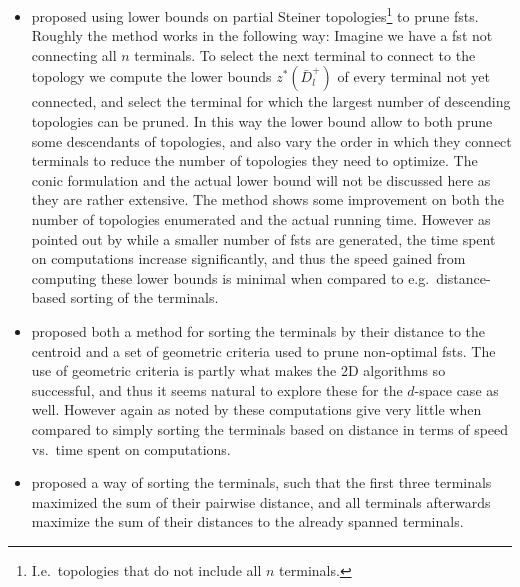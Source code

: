 \begin{itemize}
\item \textcite{fampa2008} proposed using lower bounds on partial Steiner
  topologies\footnote{I.e.\ topologies that do not include all $n$ terminals.}
  to prune \acp{fst}. Roughly the method works in the following way: Imagine we
  have a \ac{fst} not connecting all $n$ terminals. To select the next terminal
  to connect to the topology we compute the lower bounds
  $z^{\ast}(\bar{D}_l^{+})$ of every terminal not yet connected, and select the
  terminal for which the largest number of descending topologies can be
  pruned. In this way the lower bound allow \citeauthor{fampa2008} to both prune
  some descendants of topologies, and also vary the order in which they connect
  terminals to reduce the number of topologies they need to optimize. The conic
  formulation and the actual lower bound will not be discussed here as they are
  rather extensive. The method shows some improvement on both the number of
  topologies enumerated and the actual running time. However as pointed out by
  \textcite{fonseca2014} while a smaller number of \acp{fst} are generated,
  the time spent on computations increase significantly, and thus the speed
  gained from computing these lower bounds is minimal when compared to e.g.\
  distance-based sorting of the terminals.
\item \textcite{vanlaarhoven2013} proposed both a method for sorting the
  terminals by their distance to the centroid and a set of geometric criteria
  used to prune non-optimal \acp{fst}. The use of geometric criteria is partly
  what makes the 2D algorithms so successful, and thus it seems natural to
  explore these for the $d$-space case as well. However again as noted by
  \textcite{fonseca2014} these computations give very little when compared to
  simply sorting the terminals based on distance in terms of speed vs.\ time
  spent on computations.
\item \textcite{fonseca2014} proposed a way of sorting the terminals, such that
  the first three terminals maximized the sum of their pairwise distance, and
  all terminals afterwards maximize the sum of their distances to the already
  spanned terminals.
\end{itemize}


